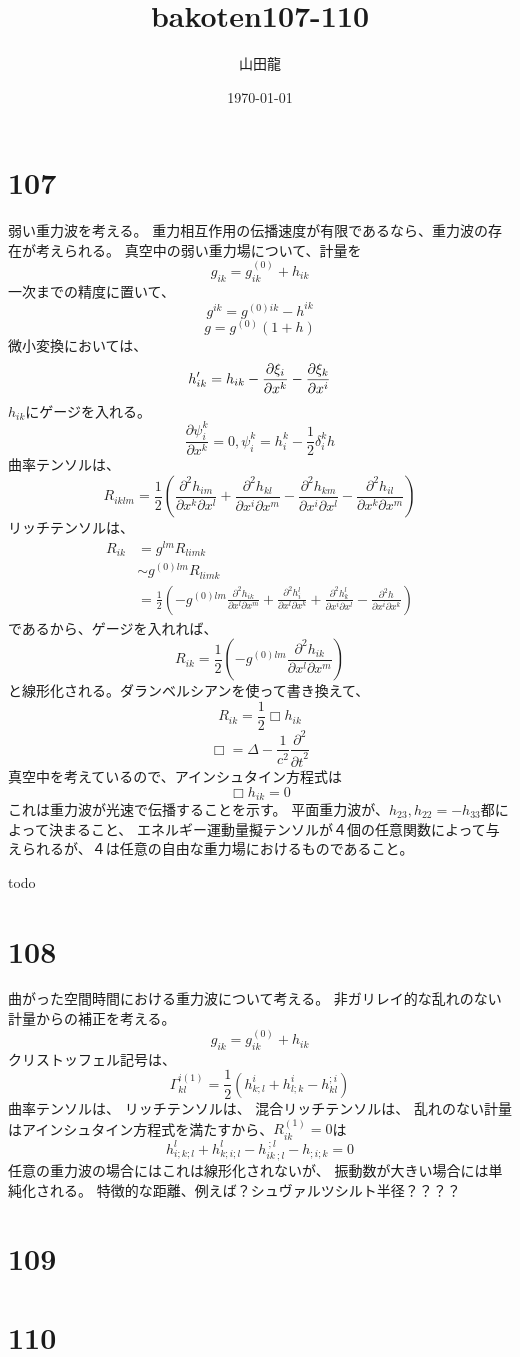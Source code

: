 \documentclass[twocolumn]{jsarticle}
\date{\today}
\author{山田龍}
\title{bakoten107-110}
\newcommand{\pder}[2][]{\frac{\partial#1}{\partial#2}}
\newcommand{\ppder}[2][]{\frac{\partial^2#1}{{\partial#2}^2}}
\newcommand{\pikder}[3][]{\frac{\partial^2#1}{{\partial#2 \partial#3}}}
\newcommand{\pderx}[2][]{\pder[#1]{x^{#2}}}
\newcommand{\half}{\frac{1}{2}}
\newcommand{\beq}{\begin{equation}}
\newcommand{\eeq}{\end{equation}}
\newcommand{\GaT}[3]{\Gamma^{#1}_{#2 #3}}
\newcommand{\ze}{(0)}
\newcommand{\on}{(1)}
\begin{document}
\maketitle
\section{107}
弱い重力波を考える。
重力相互作用の伝播速度が有限であるなら、重力波の存在が考えられる。
真空中の弱い重力場について、計量を
\beq
g_{ik} = g^{\ze}_{ik} + h_{ik} 
\eeq
一次までの精度に置いて、
\beq
g^{ik} = g^{\ze ik} - h^{ik} 
\eeq
\beq
g = g^{\ze}(1 + h)
\eeq
微小変換においては、
\beq
h^\pr_{ik} = h_{ik} - \pderx[\xi_i]{k}- \pderx[\xi_k]{i}
\eeq
$h_{ik}$にゲージを入れる。
\beq
    \pderx[\psi^k_i]{k} = 0, \psi^k_i = h^k_i - \half \delta^k_i h
\eeq
曲率テンソルは、
\beq
R_{iklm} = \half(\pikder[h_{im}]{x^k}{x^l}+\pikder[h_{kl}]{x^i}{x^m}-
\pikder[h_{km}]{x^i}{x^l}-\pikder[h_{il}]{x^k}{x^m})
\eeq
リッチテンソルは、
\begin{align}
    R_{ik} &= g^{lm}R_{limk}\\
           &\sim g^{\ze lm}R_{limk}\\
           &= \half(-g^{\ze lm}\pikder[h_{ik}]{x^l}{x^m} + \pikder[h^l_{i}]{x^l}{x^k}+ \pikder[h^l_{k}]{x^i}{x^l}-\pikder[h]{x^i}{x^k}) 
\end{align}
であるから、ゲージを入れれば、
\beq
R_{ik} = \half(-g^{\ze lm}\pikder[h_{ik}]{x^l}{x^m})
\eeq
と線形化される。ダランベルシアンを使って書き換えて、
\beq
R_{ik} = \half \Box h_{ik}
\eeq
\beq
\Box = \Delta - \frac{1}{c^2} \ppder[]{t}
\eeq
真空中を考えているので、アインシュタイン方程式は
\beq
\Box h_{ik} = 0
\eeq
これは重力波が光速で伝播することを示す。
平面重力波が、$h_{23},h_{22}=-h_{33}$都によって決まること、
エネルギー運動量擬テンソルが４個の任意関数によって与えられるが、４は任意の自由な重力場におけるものであること。

todo
\section{108}
曲がった空間時間における重力波について考える。
非ガリレイ的な乱れのない計量からの補正を考える。
\beq
g_{ik} = g^{\ze}_{ik} + h_{ik} 
\eeq
クリストッフェル記号は、
\beq
\GaT{i \on}{k}{l} = \half(h^i_{k;l}+h^i_{l;k}-h^{;i}_{kl})
\eeq
曲率テンソルは、
リッチテンソルは、
混合リッチテンソルは、
乱れのない計量はアインシュタイン方程式を満たすから、$R^{\on}_{ik} = 0$は
\beq
h^l_{i;k;l} + h^l_{k;i;l} - h^{~ ;l}_{ik ~;l} - h_{;i;k} = 0
\eeq
任意の重力波の場合にはこれは線形化されないが、
振動数が大きい場合には単純化される。
特徴的な距離、例えば？シュヴァルツシルト半径？？？？
\section{109}
\section{110}
\end{document}
